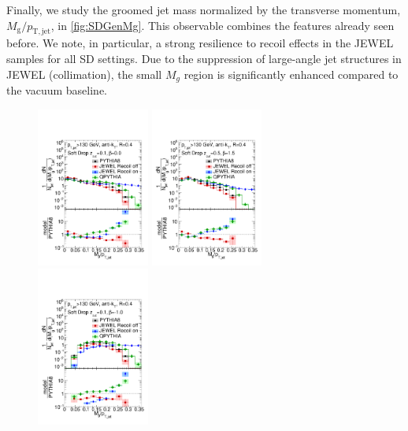 Finally, we study the groomed jet mass normalized by the transverse momentum, $M_{\mathrm{g}}/p_{\mathrm{T,jet}}$, in \autoref{fig:SDGenMg}. This observable combines the features already seen before. We note, in particular, a strong resilience to recoil effects in the JEWEL samples for all SD settings. Due to the suppression of large-angle jet structures in JEWEL (collimation), the small $M_g$ region is significantly enhanced compared to the vacuum baseline. 
\begin{figure}[th]
\centering
\includegraphics[width=0.33\textwidth]{figures/SDGen/MgOverPtgCompModelsBeta00Z01.pdf}%
\includegraphics[width=0.33\textwidth]{figures/SDGen/MgOverPtgCompModelsBeta15Z05.pdf}%
\includegraphics[width=0.33\textwidth]{figures/SDGen/MgOverPtgCompModelsBetam1Z01.pdf}%

\end{figure}
